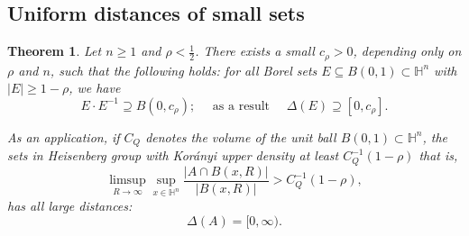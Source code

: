 \documentclass[11pt, reqno]{amsart}
\theoremstyle{plain}
\newtheorem{theorem}{Theorem}[section]
\theoremstyle{remark}
\theoremstyle{example}
\theoremstyle{definition}
\numberwithin{equation}{section}
\def\H{\mathbb{H}}
\begin{document}
\subsection{Uniform distances of small sets}\label{uniform distances of small sets proof}
\begin{theorem} \label{uniform distances of small sets} 
 Let $n \geq 1$ and $\rho<\frac12$. 
 There exists a small $c_{\rho} > 0$, depending only on $\rho$ and $n$, such that the following holds: for all Borel sets $E \subseteq B(0,1)\subset \mathbb H^n$ with $|E| \geq 1 -\rho$, we have 
\begin{equation}  \label{Steinhaus-Boardman-Hn}  
E \cdot E^{-1} \supseteq B(0,c_\rho); \quad \text{ as a result } \quad \Delta(E) \supseteq [0,c_{\rho}].  \end{equation} 

As an application, if $C_Q$ denotes the volume of the unit ball $B(0,1)\subset \mathbb H^n$, the sets in Heisenberg group with Kor\'anyi upper density at least $C_Q^{-1}(1-\rho)$ that is, 
\begin{equation}  \limsup_{R \rightarrow \infty} \sup_{x \in \H^n} \frac{|A \cap B(x,R)|}{|B(x,R)|} >C_Q^{-1}(1-\rho),\label{Boardman-condition-Hn} \end{equation} 
has all large distances:
\begin{equation}
\Delta(A) = [0, \infty).\label{part b}
\end{equation}
\end{theorem} 
\end{document}
